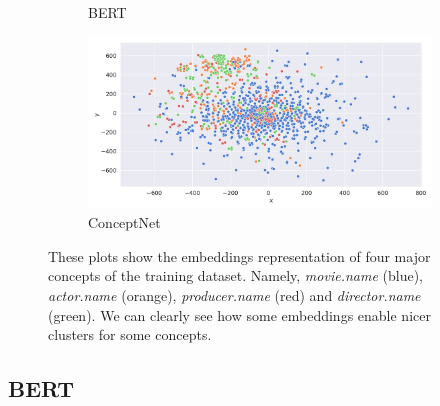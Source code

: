 \documentclass[11pt,a4paper]{article}
\begin{document}
\begin{figure}[t]
\begin{subfigure}{0.5\linewidth}
  \caption{BERT}
  \label{fig:sfig2}
\end{subfigure}%
\begin{subfigure}{0.5\linewidth}
  \centering
  \includegraphics[width=\linewidth]{img/conceptnet-embeddings.png}
  \caption{ConceptNet}
  \label{fig:sfig2}
\end{subfigure}
\caption{These plots show the embeddings representation of four major concepts of the training dataset. Namely, \textit{movie.name} (blue), \textit{actor.name} (orange), \textit{producer.name} (red) and \textit{director.name} (green). We can clearly see how some embeddings enable nicer clusters for some concepts. 
}
\label{fig:fig-emb}
\end{figure}


\subsection{BERT}
\end{document}
